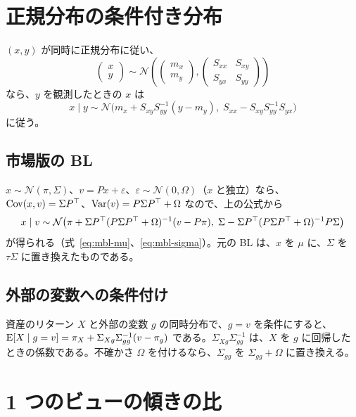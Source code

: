 \section{正規分布の条件付き分布}

$(x,y)$ が同時に正規分布に従い、
\begin{equation}
\begin{pmatrix}x\\y\end{pmatrix}\sim\mathcal N\left(\begin{pmatrix}m_x\\m_y\end{pmatrix},
\begin{pmatrix}S_{xx}&S_{xy}\\S_{yx}&S_{yy}\end{pmatrix}\right)
\end{equation}
なら、$y$ を観測したときの $x$ は
\begin{equation}
x\mid y\sim\mathcal N\bigl(m_x+S_{xy}S_{yy}^{-1}(y-m_y),\;S_{xx}-S_{xy}S_{yy}^{-1}S_{yx}\bigr)
\end{equation}
に従う。

\subsection*{市場版の BL}

$x\sim\mathcal N(\pi,\Sigma)$、$v=Px+\varepsilon$、$\varepsilon\sim\mathcal N(0,\Omega)$（$x$ と独立）なら、$\mathrm{Cov}(x,v)=\Sigma P^{\top}$、$\mathrm{Var}(v)=P\Sigma P^{\top}+\Omega$ なので、上の公式から
\begin{equation}
x\mid v\sim\mathcal N\bigl(\pi+\Sigma P^{\top}(P\Sigma P^{\top}+\Omega)^{-1}(v-P\pi),\;\Sigma-\Sigma P^{\top}(P\Sigma P^{\top}+\Omega)^{-1}P\Sigma\bigr)
\end{equation}
が得られる（式~\eqref{eq:mbl-mu}、\eqref{eq:mbl-sigma}）。元の BL は、$x$ を $\mu$ に、$\Sigma$ を $\tau\Sigma$ に置き換えたものである。

\subsection*{外部の変数への条件付け}

資産のリターン $X$ と外部の変数 $g$ の同時分布で、$g=v$ を条件にすると、$\mathrm{E}[X\mid g=v]=\pi_X+\Sigma_{Xg}\Sigma_{gg}^{-1}(v-\pi_g)$ である。$\Sigma_{Xg}\Sigma_{gg}^{-1}$ は、$X$ を $g$ に回帰したときの係数である。不確かさ $\Omega$ を付けるなら、$\Sigma_{gg}$ を $\Sigma_{gg}+\Omega$ に置き換える。

\section{1 つのビューの傾きの比}

